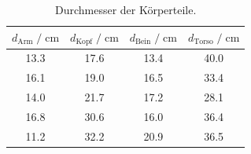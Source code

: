 \begin{table}
  \centering
    \caption{Durchmesser der Körperteile.}
    \label{tab:durchmesser}
    \begin{tabular}{c c c c}
    \toprule
    $d_\text{Arm} \;/\; \si{\centi\meter}$ & $d_\text{Kopf} \;/\; \si{\centi\meter}$ & $d_\text{Bein} \;/\; \si{\centi\meter}$ & $d_\text{Torso} \;/\; \si{\centi\meter}$ \\
    \midrule
    13.3 & 17.6 & 13.4 & 40.0 \\
    16.1 & 19.0 & 16.5 & 33.4 \\
    14.0 & 21.7 & 17.2 & 28.1 \\
    16.8 & 30.6 & 16.0 & 36.4 \\
    11.2 & 32.2 & 20.9 & 36.5 \\
    \bottomrule
  \end{tabular}
\end{table}

